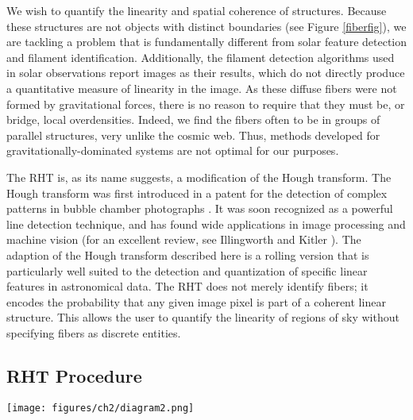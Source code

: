 We wish to quantify the linearity and spatial coherence of \hi structures. Because these structures are not objects with distinct boundaries (see Figure \ref{fiberfig}), we are tackling a problem that is fundamentally different from solar feature detection and filament identification. Additionally, the filament detection algorithms used in solar observations \citep[and][]{Starck:2003wx} report images as their results, which do not directly produce a quantitative measure of linearity in the image. As these diffuse \hi fibers were not formed by gravitational forces, there is no reason to require that they must be, or bridge, local overdensities. Indeed, we find the fibers often to be in groups of parallel structures, very unlike the cosmic web. Thus, methods developed for gravitationally-dominated systems are not optimal for our purposes.

The RHT is, as its name suggests, a modification of the Hough transform.  The Hough transform was first introduced in a patent for the detection of complex patterns in bubble chamber photographs \citep{Hough:1962tb}. It was soon recognized as a powerful line detection technique, and has found wide applications in image processing and machine vision (for an excellent review, see Illingworth and Kitler \citeyear{Illingworth:1988uo}). 
The adaption of the Hough transform described here is a rolling version that is particularly well suited to the detection and quantization of specific linear features in astronomical data. The RHT does not merely identify fibers; it encodes the probability that any given image pixel is part of a coherent linear structure. This allows the user to quantify the linearity of regions of sky without specifying fibers as discrete entities.

\subsection{RHT Procedure}\label{rhtproc}

\begin{figure*}
\centering
\texttt{[image: figures/ch2/diagram2.png]}
\caption{A diagram of the RHT procedure (\S\ref{rhtproc}). Steps 1-3 are preprocessing of the image. Step 4 shows the selection of a disk of diameter $D_W$. This window rolls across the data, centered on each pixel in turn. Step 5 shows the Hough transform applied to cartoon data, and step 6 illustrates that only data above a defined threshold is recorded. Note that this cartoon data contains three linear features, two of which (green and yellow) are centered on the selected window center $(x_0, y_0)$, and contribute the most intensity to the Hough transform. The dashed lines are representative of different levels of coherence in the data. Here, only the green line (with $\theta = \theta_2$ orientation) has RHT intensity $R(\theta, x_0, y_0)$ over the threshold Z.}
\label{diagram}
\end{figure*}


